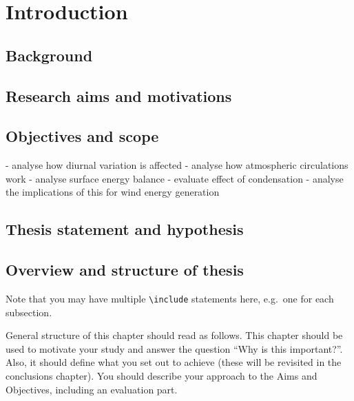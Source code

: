 \chapter{Introduction}
\label{ch:intro}

\section{Background}

\section{Research aims and motivations}


\section{Objectives and scope}

- analyse how diurnal variation is affected
- analyse how atmospheric circulations work
- analyse surface energy balance
- evaluate effect of condensation
- analyse the implications of this for wind energy generation

\section{Thesis statement and hypothesis}

\section{Overview and structure of thesis}

Note that you may have multiple \texttt{{\textbackslash}include} statements here, e.g.\ one for each subsection.

General structure of this chapter should read as follows.  This chapter should be used to motivate your study and answer the question ``Why is this important?''. Also, it should define what you set out to achieve (these will be revisited in the conclusions chapter). You should describe your approach to the Aims and Objectives, including an evaluation part.